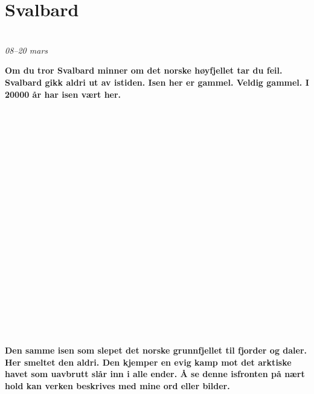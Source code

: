 \chapter*{Svalbard}\\ {\footnotesize \textit{08--20 mars}}

\begin{figure}[H]
	\centering
\noindent{}
	\caption*{}
\label{fig:venstre}
\end{figure}
\textbf{Om du tror Svalbard minner om det norske høyfjellet tar du feil.
Svalbard gikk aldri ut av istiden.
Isen
her er gammel.  Veldig gammel. I 20000 år har isen vært her.} 

\chapter*{\\ \\}\\ {\footnotesize \textit{\\ \\ \\ \\ \\ \\ \\ \\ \\ \\ \\ \\ }}
\begin{figure}[H]
	\centering
\noindent{}
	\caption*{}
\label{fig:venstre}
\end{figure}
\textbf{Den samme isen som
slepet det norske grunnfjellet til fjorder og daler. Her smeltet den
aldri. Den kjemper en evig kamp mot det arktiske havet som uavbrutt slår inn i alle ender. Å se denne isfronten på nært hold kan
verken beskrives med mine ord eller bilder.}


